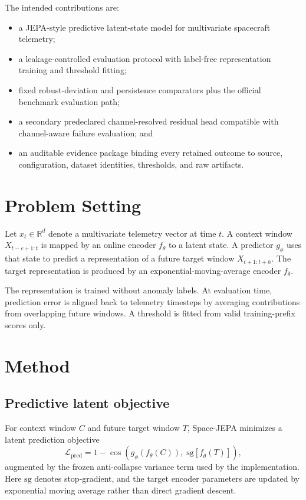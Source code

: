 \documentclass[conference]{IEEEtran}
\begin{document}
The intended contributions are:
\begin{itemize}
    \item a JEPA-style predictive latent-state model for multivariate spacecraft telemetry;
    \item a leakage-controlled evaluation protocol with label-free representation training and threshold fitting;
    \item fixed robust-deviation and persistence comparators plus the official benchmark evaluation path;
    \item a secondary predeclared channel-resolved residual head compatible with channel-aware failure evaluation; and
    \item an auditable evidence package binding every retained outcome to source, configuration, dataset identities, thresholds, and raw artifacts.
\end{itemize}

\section{Problem Setting}
Let $x_t \in \mathbb{R}^d$ denote a multivariate telemetry vector at time $t$. A context window $X_{t-c+1:t}$ is mapped by an online encoder $f_\theta$ to a latent state. A predictor $g_\phi$ uses that state to predict a representation of a future target window $X_{t+1:t+h}$. The target representation is produced by an exponential-moving-average encoder $f_{\bar\theta}$.

The representation is trained without anomaly labels. At evaluation time, prediction error is aligned back to telemetry timesteps by averaging contributions from overlapping future windows. A threshold is fitted from valid training-prefix scores only.

\section{Method}
\subsection{Predictive latent objective}
For context window $C$ and future target window $T$, Space-JEPA minimizes a latent prediction objective
\begin{equation}
\mathcal{L}_{\mathrm{pred}} = 1 - \cos\left(g_\phi(f_\theta(C)),\;\mathrm{sg}[f_{\bar\theta}(T)]\right),
\end{equation}
augmented by the frozen anti-collapse variance term used by the implementation. Here $\mathrm{sg}$ denotes stop-gradient, and the target encoder parameters are updated by exponential moving average rather than direct gradient descent.
\end{document}
